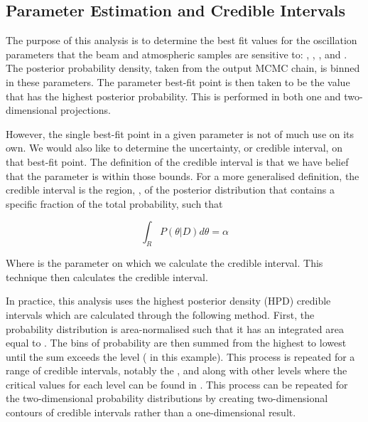 \subsection{Parameter Estimation and Credible Intervals}
\label{sec:MarkovChainMonteCarlo_ParameterEstimation}

The purpose of this analysis is to determine the best fit values for the oscillation parameters that the beam and atmospheric samples are sensitive to: , , , and .
The posterior probability density, taken from the output MCMC chain, is binned in these parameters. The parameter best-fit point is then taken to be the value that has the highest posterior probability. This is performed in both one and two-dimensional projections.

However, the single best-fit point in a given parameter is not of much use on its own. We would also like to determine the uncertainty, or credible interval, on that best-fit point. The definition of the \quickmath{1\sigma} credible interval is that we have  belief that the parameter is within those bounds. For a more generalised definition, the credible interval is the region, , of the posterior distribution that contains a specific fraction of the total probability, such that

\begin{equation}
\int_{R} P(\theta|D)d\theta = \alpha
\end{equation}

Where \quickmath{\theta} is the parameter on which we calculate the credible interval. This technique then calculates the  credible interval.

In practice, this analysis uses the highest posterior density (HPD) credible intervals which are calculated through the following method. First, the probability distribution is area-normalised such that it has an integrated area equal to . The bins of probability are then summed from the highest to lowest until the sum exceeds the \quickmath{1\sigma} level ( in this example). This process is repeated for a range of credible intervals, notably the \quickmath{1\sigma}, \quickmath{2\sigma} and \quickmath{3\sigma} along with other levels where the critical values for each level can be found in \cite{Particle_Data_Group2020-ms}. This process can be repeated for the two-dimensional probability distributions by creating two-dimensional contours of credible intervals rather than a one-dimensional result. 

